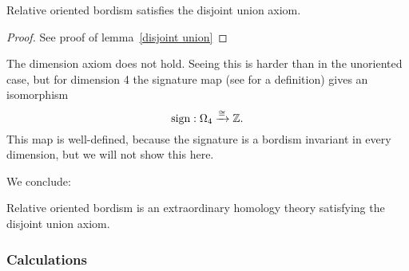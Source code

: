 \documentclass[a4paper,11pt]{article}
\begin{document}
\begin{lemma}
    Relative oriented bordism satisfies the disjoint union axiom.
\end{lemma}

\begin{proof}
    See proof of lemma\ \ref{disjoint union}
\end{proof}


\begin{remark}
    The dimension axiom does not hold. Seeing this is harder than in the unoriented case, but for dimension 4 the signature map (see \cite[\nopp X.9]{tomdieck} for a definition) gives an isomorphism
    \[\mathrm{sign}:\Omega_4\xrightarrow{\cong}\mathbb{Z}.\]
    This map is well-defined, because the signature is a bordism invariant in every dimension, but we will not show this here.
\end{remark}

We conclude:
\begin{theorem}
    Relative oriented bordism is an extraordinary homology theory satisfying the disjoint union axiom.
\end{theorem}

\subsubsection{Calculations}
\end{document}
